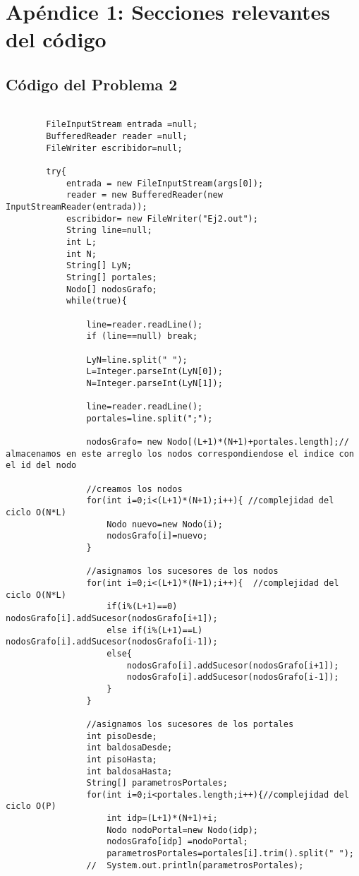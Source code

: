 \section{Apéndice 1: Secciones relevantes del código}


\subsection{Código del Problema 2}

\begin{lstlisting}

		FileInputStream entrada =null;  
		BufferedReader reader =null;
		FileWriter escribidor=null;
		
		try{
			entrada = new FileInputStream(args[0]);
			reader = new BufferedReader(new InputStreamReader(entrada));
			escribidor= new FileWriter("Ej2.out");				
			String line=null;	
			int L;
			int N;	
			String[] LyN;
			String[] portales;
			Nodo[] nodosGrafo;	
			while(true){
				
				line=reader.readLine();
				if (line==null) break;

				LyN=line.split(" ");
				L=Integer.parseInt(LyN[0]);
				N=Integer.parseInt(LyN[1]);
				
				line=reader.readLine();
				portales=line.split(";");
				
				nodosGrafo= new Nodo[(L+1)*(N+1)+portales.length];// almacenamos en este arreglo los nodos correspondiendose el indice con el id del nodo
				
				//creamos los nodos
				for(int i=0;i<(L+1)*(N+1);i++){ //complejidad del ciclo O(N*L)
					Nodo nuevo=new Nodo(i);
					nodosGrafo[i]=nuevo;
				}
				
				//asignamos los sucesores de los nodos
				for(int i=0;i<(L+1)*(N+1);i++){  //complejidad del ciclo O(N*L)
					if(i%(L+1)==0) nodosGrafo[i].addSucesor(nodosGrafo[i+1]);
					else if(i%(L+1)==L) nodosGrafo[i].addSucesor(nodosGrafo[i-1]);
					else{
						nodosGrafo[i].addSucesor(nodosGrafo[i+1]);
						nodosGrafo[i].addSucesor(nodosGrafo[i-1]);
					}
				}
				
				//asignamos los sucesores de los portales
				int pisoDesde;
				int baldosaDesde;
				int pisoHasta;
				int baldosaHasta;
				String[] parametrosPortales;
				for(int i=0;i<portales.length;i++){//complejidad del ciclo O(P)
					int idp=(L+1)*(N+1)+i;
					Nodo nodoPortal=new Nodo(idp);
					nodosGrafo[idp] =nodoPortal;
					parametrosPortales=portales[i].trim().split(" ");
				//	System.out.println(parametrosPortales);
					

\end{lstlisting}
